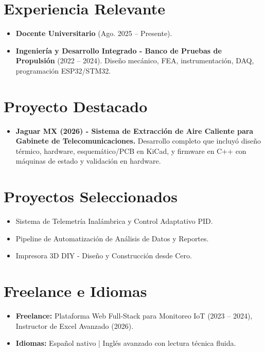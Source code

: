 \documentclass[10pt,a4paper]{article}
\begin{document}
\section*{Experiencia Relevante}
\begin{itemize}[leftmargin=*, noitemsep]
    \item \textbf{Docente Universitario} (Ago. 2025 -- Presente).
    \item \textbf{Ingeniería y Desarrollo Integrado - Banco de Pruebas de Propulsión} (2022 -- 2024). Diseño mecánico, FEA, instrumentación, DAQ, programación ESP32/STM32.
\end{itemize}

\section*{Proyecto Destacado}
\begin{itemize}[leftmargin=*, noitemsep]
    \item \textbf{Jaguar MX (2026) - Sistema de Extracción de Aire Caliente para Gabinete de Telecomunicaciones.} Desarrollo completo que incluyó diseño térmico, hardware, esquemático/PCB en KiCad, y firmware en C++ con máquinas de estado y validación en hardware.
\end{itemize}

\section*{Proyectos Seleccionados}
\begin{itemize}[leftmargin=*, noitemsep]
    \item Sistema de Telemetría Inalámbrica y Control Adaptativo PID.
    \item Pipeline de Automatización de Análisis de Datos y Reportes.
    \item Impresora 3D DIY - Diseño y Construcción desde Cero.
\end{itemize}

\section*{Freelance e Idiomas}
\begin{itemize}[leftmargin=*, noitemsep]
    \item \textbf{Freelance:} Plataforma Web Full-Stack para Monitoreo IoT (2023 -- 2024), Instructor de Excel Avanzado (2026).
    \item \textbf{Idiomas:} Español nativo | Inglés avanzado con lectura técnica fluida.
\end{itemize}
\end{document}
